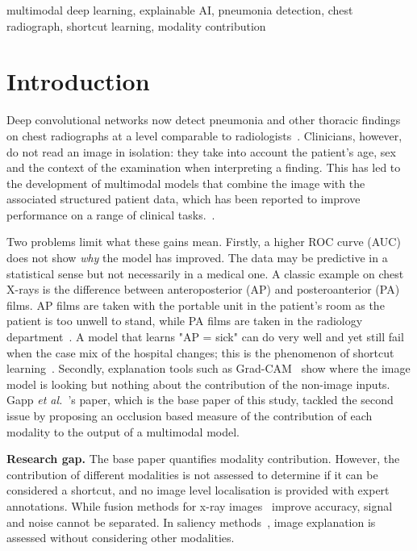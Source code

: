 \documentclass[conference]{IEEEtran}
\begin{document}
\begin{IEEEkeywords}
multimodal deep learning, explainable AI, pneumonia detection, chest radiograph, shortcut learning, modality contribution
\end{IEEEkeywords}

\section{Introduction}
\label{sec:intro}

Deep convolutional networks now detect pneumonia and other thoracic findings on chest radiographs at a level comparable to radiologists~\cite{rajpurkar2018chexnext}. Clinicians, however, do not read an image in isolation: they take into account the patient's age, sex and the context of the examination when interpreting a finding. This has led to the development of multimodal models that combine the image with the associated structured patient data, which has been reported to improve performance on a range of clinical tasks.~\cite{soenksen2022haim,acosta2022multimodal}.

Two problems limit what these gains mean. Firstly, a higher ROC curve (AUC) does not show \emph{why} the model has improved. The data may be predictive in a statistical sense but not necessarily in a medical one. A classic example on chest X-rays is the difference between anteroposterior (AP) and posteroanterior (PA) films. AP films are taken with the portable unit in the patient's room as the patient is too unwell to stand, while PA films are taken in the radiology department~\cite{zech2018confounding}. A model that learns "AP = sick" can do very well and yet still fail when the case mix of the hospital changes; this is the phenomenon of shortcut learning~\cite{geirhos2020shortcut,degrave2021shortcuts}. Secondly, explanation tools such as Grad-CAM~\cite{selvaraju2017gradcam} show where the image model is looking but nothing about the contribution of the non-image inputs. Gapp \emph{et al.}~\cite{gapp2025modality}'s paper, which is the base paper of this study, tackled the second issue by proposing an occlusion based measure of the contribution of each modality to the output of a multimodal model. 


\textbf{Research gap.} The base paper quantifies modality contribution. However, the contribution of different modalities is not assessed to determine if it can be considered a shortcut, and no image level localisation is provided with expert annotations. While fusion methods for x-ray images~\cite{truong2025multimodal,soenksen2022haim} improve accuracy, signal and noise cannot be separated. In saliency methods~\cite{saporta2022saliency,arun2021trustworthiness}, image explanation is assessed without considering other modalities. 
\end{document}
